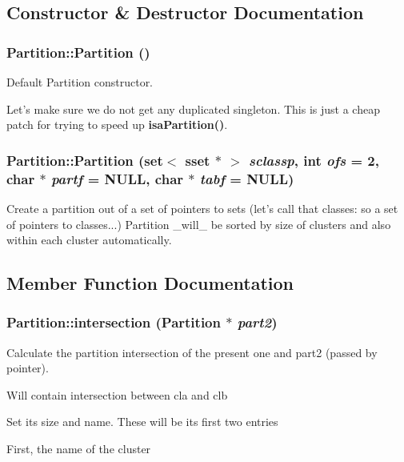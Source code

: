 \subsection{Constructor \& Destructor Documentation}
\subsubsection{\setlength{\rightskip}{0pt plus 5cm}Partition::Partition ()}\label{classPartition_a0}


Default Partition constructor. 

Let's make sure we do not get any duplicated singleton. This is just a cheap patch for trying to speed up {\bf isa\-Partition()}. 
\subsubsection{\setlength{\rightskip}{0pt plus 5cm}Partition::Partition (set$<$ sset $\ast$ $>$ {\em sclassp}, int {\em ofs} = 2, char $\ast$ {\em partf} = NULL, char $\ast$ {\em tabf} = NULL)}\label{classPartition_a3}


Create a partition out of a set of pointers to sets (let's call that classes: so a set of pointers to classes...) Partition \_\-will\_\- be sorted by size of clusters and also within each cluster automatically.

\subsection{Member Function Documentation}
\subsubsection{ Partition::intersection ({\bf Partition} $\ast$ {\em part2})}\label{classPartition_a54}


Calculate the partition intersection of the present one and part2 (passed by pointer). 

Will contain intersection between cla and clb

Set its size and name. These will be its first two entries

First, the name of the cluster

